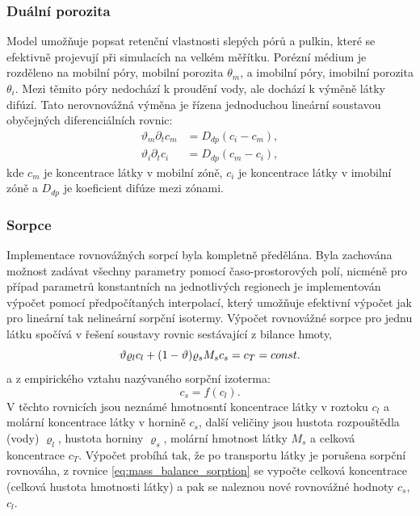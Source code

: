 \documentclass[11pt]{report}
\begin{document}
\subsubsection{Duální porozita}
Model umožňuje popsat retenční vlastnosti slepých pórů a pulkin, které se 
efektivně projevují při simulacích na velkém měřítku. Porézní médium je 
rozděleno na mobilní póry, mobilní porozita $\theta_m$, a imobilní póry, 
imobilní porozita $\theta_i$. Mezi těmito póry nedochází k proudění vody, ale 
dochází k výměně látky difúzí. Tato nerovnovážná výměna je řízena jednoduchou 
lineární soustavou obyčejných diferenciálních rovnic:
\begin{align}
    \vartheta_m \partial_t c_m &= D_{dp} ( c_i - c_m), 
\label{eqn:dual_porosity_ode1}\\
    \vartheta_i \partial_t c_i &= D_{dp} ( c_m - c_i), 
\label{eqn:dual_porosity_ode2}
\end{align}
kde $c_m$ je koncentrace látky v mobilní zóně, $c_i$ je koncentrace látky v 
imobilní zóně a $D_{dp}$ je koeficient difúze mezi zónami.


\subsubsection{Sorpce}
Implementace rovnovážných sorpcí byla kompletně předělána. Byla zachována 
možnost zadávat všechny parametry pomocí časo-prostorových polí, nicméně pro 
případ parametrů konstantních na jednotlivých regionech je implementován výpočet 
pomocí předpočítaných interpolací, který umožňuje efektivní výpočet jak pro 
lineární tak nelineární sorpční isotermy. Výpočet rovnovážné sorpce pro jednu 
látku spočívá v řešení soustavy rovnic sestávající z bilance hmoty,
\begin{equation}
\label{eq:mass_balance_sorption}
\vartheta \varrho_l c_l + (1-\vartheta) \varrho_s M_s c_s = c_T = const.
\end{equation}
a z empirického vztahu nazývaného sorpční izoterma:
\[
    c_s=f(c_l).
\]
V těchto rovnicích jsou neznámé hmotnosntí koncentrace látky v roztoku $c_l$ a 
molární koncentrace látky v hornině $c_s$, další veličiny jsou hustota 
rozpouštědla (vody) $\varrho_l$, hustota horniny $\varrho_s$, molární hmotnost 
látky $M_s$ a celková koncentrace $c_T$. Výpočet probíhá tak, že po transportu 
látky je porušena sorpční rovnováha, z rovnice \eqref{eq:mass_balance_sorption} 
se vypočte celková koncentrace (celková hustota hmotnosti látky) a pak se 
naleznou nové rovnovážné hodnoty $c_s$, $c_l$.
\end{document}
